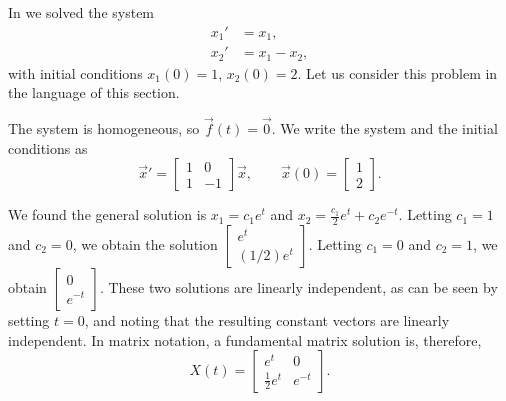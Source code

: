 \documentclass{ximera}
\begin{document}
\begin{example}
    In  we solved the system
    \begin{align*}
        x_1' & = x_1 , \\
        x_2' & = x_1 - x_2 ,
    \end{align*}
    with initial conditions $x_1(0) = 1$, $x_2(0) = 2$. Let us consider this problem in the language of this section.
    
    The system is homogeneous, so $\vec{f}(t) = \vec{0}$. We write the system and the initial conditions as
    \begin{equation*}
        {\vec{x}}' =
        \begin{bmatrix}
            1 & 0 \\
            1 & -1
        \end{bmatrix}
        \vec{x} , \qquad \vec{x}(0) = 
        \begin{bmatrix}
            1 \\
            2
        \end{bmatrix} .
    \end{equation*}
    
    We found the general solution is
    $x_1 = c_1 e^t $ and $x_2 = \frac{c_1}{2}e^{t} + c_2e^{-t}$. 
    Letting $c_1=1$ and $c_2=0$, we obtain the solution
    $\left[ \begin{smallmatrix} e^t \\ (1/2) e^t \end{smallmatrix} \right]$.
    Letting $c_1=0$ and $c_2=1$, we obtain
    $\left[ \begin{smallmatrix} 0 \\ e^{-t} \end{smallmatrix} \right]$.
    These two solutions are linearly independent, as can be seen by setting $t=0$, and noting that the resulting constant vectors are linearly independent. In matrix notation, a fundamental matrix solution is, therefore,
    \begin{equation*}
        X(t) = 
        \begin{bmatrix}
            e^t & 0 \\
            \frac{1}{2} e^t & e^{-t}
        \end{bmatrix} .
    \end{equation*}
    

\end{example}
\end{document}
